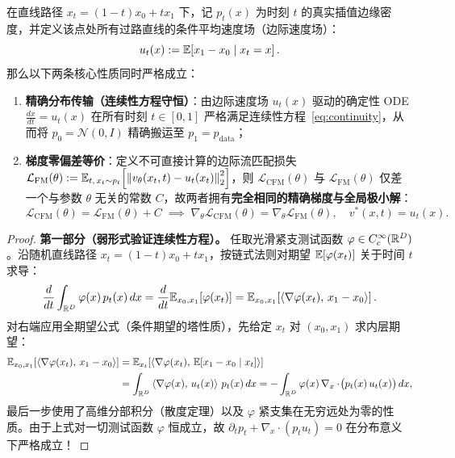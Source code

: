 \begin{thmBox}
\begin{theorem}[条件流匹配与边际流匹配的梯度等价性及分布守恒定理]
\label{thm:cfm}
在直线路径 $x_t = (1-t)x_0 + t x_1$ 下，记 $p_t(x)$ 为时刻 $t$ 的真实插值边缘密度，并定义该点处所有过路直线的条件平均速度场（边际速度场）：
\begin{equation}
  u_t(x) := \mathbb{E}\!\left[x_1 - x_0 \;\middle|\; x_t = x\right].
  \label{eq:marginal-vel}
\end{equation}
那么以下两条核心性质同时严格成立：
\begin{enumerate}
  \item \textbf{精确分布传输（连续性方程守恒）}：由边际速度场 $u_t(x)$ 驱动的确定性 ODE $\frac{dx}{dt} = u_t(x)$ 在所有时刻 $t \in [0, 1]$ 严格满足连续性方程~\eqref{eq:continuity}，从而将 $p_0 = \mathcal{N}(0, I)$ 精确搬运至 $p_1 = p_{\text{data}}$；
  \item \textbf{梯度零偏差等价}：定义不可直接计算的边际流匹配损失 $\mathcal{L}_{\mathrm{FM}}(\theta) := \mathbb{E}_{t,\, x_t \sim p_t}\!\left[\left\|v_\theta(x_t, t) - u_t(x_t)\right\|_2^2\right]$，则 $\mathcal{L}_{\mathrm{CFM}}(\theta)$ 与 $\mathcal{L}_{\mathrm{FM}}(\theta)$ 仅差一个与参数 $\theta$ 无关的常数 $C$，故两者拥有\textbf{完全相同的精确梯度与全局极小解}：
  \begin{equation}
    \mathcal{L}_{\mathrm{CFM}}(\theta) = \mathcal{L}_{\mathrm{FM}}(\theta) + C
    \;\implies\;
    \nabla_\theta \mathcal{L}_{\mathrm{CFM}}(\theta) = \nabla_\theta \mathcal{L}_{\mathrm{FM}}(\theta),
    \quad
    v^*(x, t) = u_t(x).
    \label{eq:cfm-fm-equiv}
  \end{equation}
\end{enumerate}
\end{theorem}
\begin{proof}
\textbf{第一部分（弱形式验证连续性方程）。} 任取光滑紧支测试函数 $\varphi \in C_c^\infty(\mathbb{R}^D)$。沿随机直线路径 $x_t = (1-t)x_0 + t x_1$，按链式法则对期望 $\mathbb{E}[\varphi(x_t)]$ 关于时间 $t$ 求导：
\[
  \frac{d}{dt}\int_{\mathbb{R}^D} \varphi(x)\, p_t(x)\, dx
  = \frac{d}{dt}\mathbb{E}_{x_0, x_1}\!\left[\varphi(x_t)\right]
  = \mathbb{E}_{x_0, x_1}\!\left[\left\langle \nabla \varphi(x_t),\, x_1 - x_0 \right\rangle\right].
\]
对右端应用全期望公式（条件期望的塔性质），先给定 $x_t$ 对 $(x_0, x_1)$ 求内层期望：
\begin{align*}
  \mathbb{E}_{x_0, x_1}\!\left[\left\langle \nabla \varphi(x_t),\, x_1 - x_0 \right\rangle\right]
  &= \mathbb{E}_{x_t}\!\left[\left\langle \nabla \varphi(x_t),\, \mathbb{E}\!\left[x_1 - x_0 \mid x_t\right] \right\rangle\right] \\
  &= \int_{\mathbb{R}^D} \left\langle \nabla \varphi(x),\, u_t(x) \right\rangle\, p_t(x)\, dx
   = -\int_{\mathbb{R}^D} \varphi(x)\,\nabla_x \cdot\!\big(p_t(x)\, u_t(x)\big)\, dx,
\end{align*}
最后一步使用了高维分部积分（散度定理）以及 $\varphi$ 紧支集在无穷远处为零的性质。由于上式对一切测试函数 $\varphi$ 恒成立，故 $\partial_t p_t + \nabla_x \cdot (p_t u_t) = 0$ 在分布意义下严格成立！


\end{proof}
\end{thmBox}
